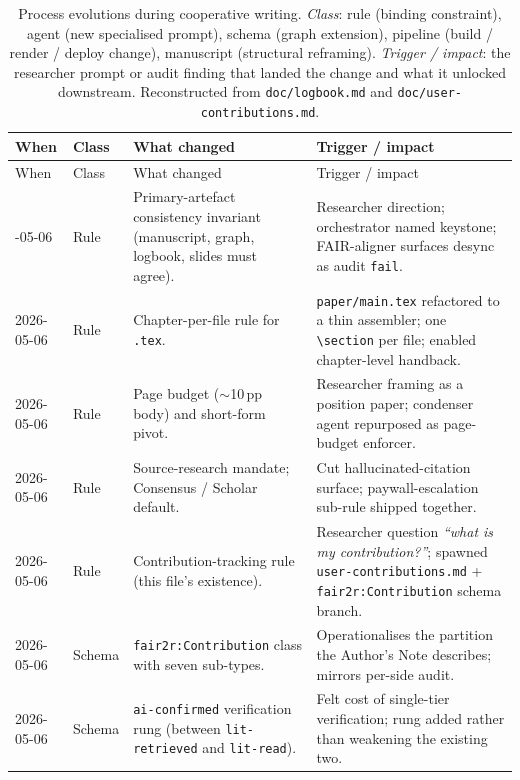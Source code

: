 \renewcommand{\arraystretch}{1.15}
\begin{longtable}{@{}p{1.55cm}p{1.4cm}p{4.2cm}p{6.6cm}@{}}
\caption{Process evolutions during cooperative writing. \emph{Class}:
rule (binding constraint), agent (new specialised prompt), schema
(graph extension), pipeline (build / render / deploy change),
manuscript (structural reframing). \emph{Trigger / impact}: the
researcher prompt or audit finding that landed the change and what it
unlocked downstream. Reconstructed from \texttt{doc/logbook.md} and
\texttt{doc/user-contributions.md}.}
\label{tab:evolutions} \\
\toprule
When & Class & What changed & Trigger / impact \\
\midrule
\endfirsthead
\toprule
When & Class & What changed & Trigger / impact \\
\midrule
\endhead
\bottomrule
\endfoot
2026-05-06 & Rule       & Primary-artefact consistency invariant (manuscript, graph, logbook, slides must agree). & Researcher direction; orchestrator named keystone; FAIR-aligner surfaces desync as audit \texttt{fail}. \\
2026-05-06 & Rule       & Chapter-per-file rule for \texttt{.tex}.            & \texttt{paper/main.tex} refactored to a thin assembler; one \verb|\section| per file; enabled chapter-level handback. \\
2026-05-06 & Rule       & Page budget (\(\sim\)10\,pp body) and short-form pivot. & Researcher framing as a position paper; condenser agent repurposed as page-budget enforcer. \\
2026-05-06 & Rule       & Source-research mandate; Consensus / Scholar default. & Cut hallucinated-citation surface; paywall-escalation sub-rule shipped together. \\
2026-05-06 & Rule       & Contribution-tracking rule (this file's existence). & Researcher question \emph{``what is my contribution?''}; spawned \texttt{user-contributions.md} + \texttt{fair2r:Contribution} schema branch. \\
2026-05-06 & Schema     & \texttt{fair2r:Contribution} class with seven sub-types. & Operationalises the partition the Author's Note describes; mirrors per-side audit. \\
2026-05-06 & Schema     & \texttt{ai-confirmed} verification rung (between \texttt{lit-retrieved} and \texttt{lit-read}). & Felt cost of single-tier verification; rung added rather than weakening the existing two. \\

\end{longtable}
